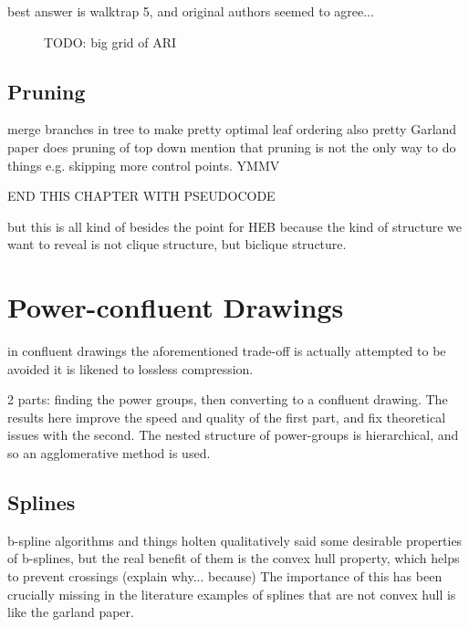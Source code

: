 best answer is walktrap 5, and original authors seemed to agree...

\begin{figure}
    \caption{TODO: big grid of ARI}
    \label{fig:ARI}
\end{figure}

\subsection{Pruning}
merge branches in tree to make pretty
optimal leaf ordering also pretty
Garland paper does pruning of top down
mention that pruning is not the only way to do things e.g. skipping more control points. YMMV

END THIS CHAPTER WITH PSEUDOCODE

but this is all kind of besides the point for HEB because the kind of structure we want to reveal is not clique structure, but biclique structure.

\section{Power-confluent Drawings}
in confluent drawings the aforementioned trade-off is actually attempted to be avoided
it is likened to lossless compression.

2 parts: finding the power groups, then converting to a confluent drawing. The results here improve the speed and quality of the first part, and fix theoretical issues with the second.
The nested structure of power-groups is hierarchical, and so an agglomerative method is used.
\subsection{Splines}
b-spline algorithms and things
holten qualitatively said some desirable properties of b-splines, but the real benefit of them is the convex hull property, which helps to prevent crossings (explain why... because)
The importance of this has been crucially missing in the literature
examples of splines that are not convex hull is like the garland paper.
